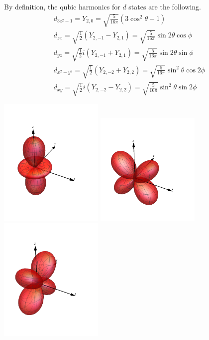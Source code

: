 \begin{questions}

\begin{solution}

By definition, the qubic harmonics for $d$ states are the following.
\begin{eqnarray}
  d_{3z^2-1} = Y_{2,0} = \sqrt{\frac{5}{16\pi}}\left( 3\cos^2\theta -1\right) \label{qub:1}\qquad\\
  d_{zx} = \sqrt{\frac{1}{2}} \left(Y_{2,-1}- Y_{2,1} \right) = \sqrt{\frac{5}{16\pi}}\sin{2\theta}\cos{\phi}  \label{qub:2}\\
  d_{yz} = \sqrt{\frac{1}{2}} i\left(Y_{2,-1}+ Y_{2,1} \right) = \sqrt{\frac{5}{16\pi}}\sin{2\theta}\sin{\phi} \label{qub:3}\\
  d_{x^2-y^2} = \sqrt{\frac{1}{2}} \left(Y_{2,-2} +Y_{2,2} \right) = \sqrt{\frac{5}{16\pi}}\sin^2{\theta}\cos{2\phi} \label{qub:4}\\
  d_{xy} = \sqrt{\frac{1}{2}}i \left(Y_{2,-2}- Y_{2,2} \right) = \sqrt{\frac{5}{16\pi}}\sin^2{\theta}\sin{2\phi} \label{qub:5}
\end{eqnarray}

\includegraphics[width=50mm]{1.png}
\includegraphics[width=50mm]{2.png}
\includegraphics[width=50mm]{3.png}


\end{solution}
\end{questions}
